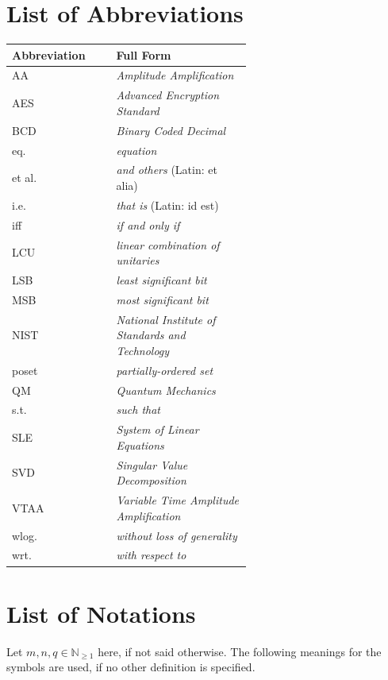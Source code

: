 \newpage

\tableofcontents

\newpage

\listofalgorithms
\listoffigures
\listoftables

\section*{List of Abbreviations}

\newcommand{\notationentry}[2]{#1 & #2\\}

\begin{table}[!hbpt]
    \centering
    \begin{tabular}{p{0.2\linewidth}p{0.4\linewidth}}
        \notationentry{\textbf{Abbreviation}}{\textbf{Full Form}}
        \hline
        \notationentry{AA}{\emph{Amplitude Amplification}}
        \notationentry{AES}{\emph{Advanced Encryption Standard}}
        \notationentry{BCD}{\emph{Binary Coded Decimal}}
        \notationentry{eq.}{\emph{equation}}
        \notationentry{et al.}{\emph{and others} (Latin: et alia)}
        \notationentry{i.e.}{\emph{that is} (Latin: id est)}
        \notationentry{iff}{\emph{if and only if}}
        \notationentry{LCU}{\emph{linear combination of unitaries}}
        \notationentry{LSB}{\emph{least significant bit}}
        \notationentry{MSB}{\emph{most significant bit}}
        \notationentry{NIST}{\emph{National Institute of Standards and Technology}}
        \notationentry{poset}{\emph{partially-ordered set}}
        \notationentry{QM}{\emph{Quantum Mechanics}}
        \notationentry{s.t.}{\emph{such that}}
        \notationentry{SLE}{\emph{System of Linear Equations}}
        \notationentry{SVD}{\emph{Singular Value Decomposition}}
        \notationentry{VTAA}{\emph{Variable Time Amplitude Amplification}}
        \notationentry{wlog.}{\emph{without loss of generality}}
        \notationentry{wrt.}{\emph{with respect to}}
    \end{tabular}
\end{table}

\newpage

\section*{List of Notations}

Let \(m, n, q \in \mathbb{N}_{\geq 1}\) here, if not said otherwise. The following meanings for the symbols are used, if no other definition is specified.

